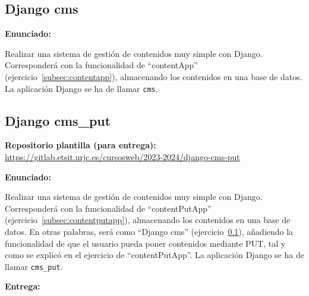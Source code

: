 \subsection{Django cms}
\label{subsec:django-cms}

\textbf{Enunciado:}

Realizar una sistema de gestión de contenidos muy simple con Django. Corresponderá con la funcionalidad de ``contentApp'' (ejercicio~\ref{subsec:contentapp}), almacenando los contenidos en una base de datos. La aplicación Django se ha de llamar \texttt{cms}.


%


\subsection{Django cms\_put}
\label{subsec:django-cms-put}

\textbf{Repositorio plantilla (para entrega):} \\
\url{https://gitlab.etsit.urjc.es/cursosweb/2023-2024/django-cms-put}

\textbf{Enunciado:}

Realizar una sistema de gestión de contenidos muy simple con Django. Corresponderá con la funcionalidad de ``contentPutApp'' (ejercicio~\ref{subsec:contentputapp}), almacenando los contenidos en una base de datos. En otras palabras, será como ``Django cms'' (ejercicio~\ref{subsec:django-cms}), añadiendo la funcionalidad de que el usuario pueda poner contenidos mediante PUT, tal y como se explicó en el ejercicio de ``contentPutApp''. La aplicación Django se ha de llamar \texttt{cms\_put}.

\textbf{Entrega:}

